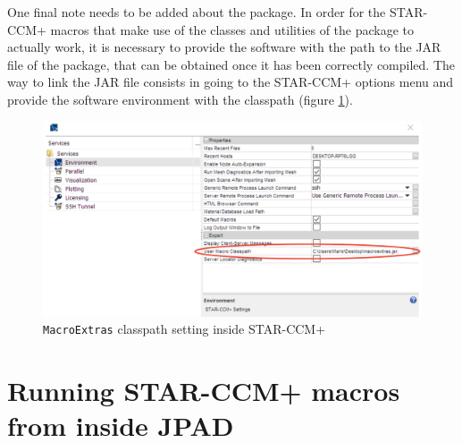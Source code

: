 \bigskip
\noindent
One final note needs to be added about the package. In order for the STAR-CCM+ macros that make use of the classes and utilities of the package to actually work, it is necessary to provide the software with the path to the \gls{JAR} file of the package, that can be obtained once it has been correctly compiled. The way to link the \gls{JAR} file consists in going to the STAR-CCM+ options menu and provide the software environment with the classpath (figure \ref{fig:starclasspath}).
% 
\begin{figure}[H]
\centering
\includegraphics[scale=0.45]{Immagini/Capitolo4/starclasspath2}
\caption{\lstinline[language=Java]!MacroExtras! classpath setting inside STAR-CCM+}
\label{fig:starclasspath}
\end{figure}
%  

\section{Running STAR-CCM+ macros from inside JPAD}
\label{sec4.4}

